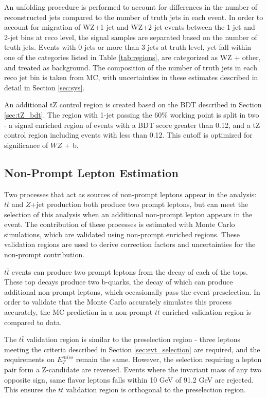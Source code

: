 An unfolding procedure is performed to account for differences in the number of reconstructed jets compared to the number of truth jets in each event. In order to account for migration of WZ+1-jet and WZ+2-jet events between the 1-jet and 2-jet bins at reco level, the signal samples are separated based on the number of truth jets. Events with 0 jets or more than 3 jets at truth level, yet fall within one of the categories listed in Table \ref{tab:regions}, are categorized as WZ + other, and treated as background. The composition of the number of truth jets in each reco jet bin is taken from MC, with uncertainties in these estimates described in detail in Section \ref{sec:sys}. 

An additional tZ control region is created based on the BDT described in Section \ref{sec:tZ_bdt}. The region with 1-jet passing the 60\% working point is split in two - a signal enriched region of events with a BDT score greater than 0.12, and a tZ control region including events with less than 0.12. This cutoff is optimized for significance of $WZ$ + b.

\subsection{Non-Prompt Lepton Estimation}
\label{sec:fakes}

Two processes that act as sources of non-prompt leptons appear in the analysis: $t\bar{t}$ and $Z$+jet production both produce two prompt leptons, but can meet the selection of this analysis when an additional non-prompt lepton appears in the event. The contribution of these processes is estimated with Monte Carlo simulations, which are validated using non-prompt enriched regions. These validation regions are used to derive correction factors and uncertainties for the non-prompt contribution.

$t\bar{t}$ events can produce two prompt leptons from the decay of each of the tops. These top decays produce two b-quarks, the decay of which can produce additional non-prompt leptons, which occasionally pass the event preselection. In order to validate that the Monte Carlo accurately simulates this process accurately, the MC prediction in a non-prompt $t\bar{t}$ enriched validation region is compared to data.

The $t\bar{t}$ validation region is similar to the preselection region - three leptons meeting the criteria described in Section \ref{sec:evt_selection} are required, and the requirements on $E_T^{miss}$ remain the same. However, the selection requiring a lepton pair form a Z-candidate are reversed. Events where the invariant mass of any two opposite sign, same flavor leptons falls within 10 GeV of 91.2 GeV are rejected. This ensures the $t\bar{t}$ validation region is orthogonal to the preselection region. 

